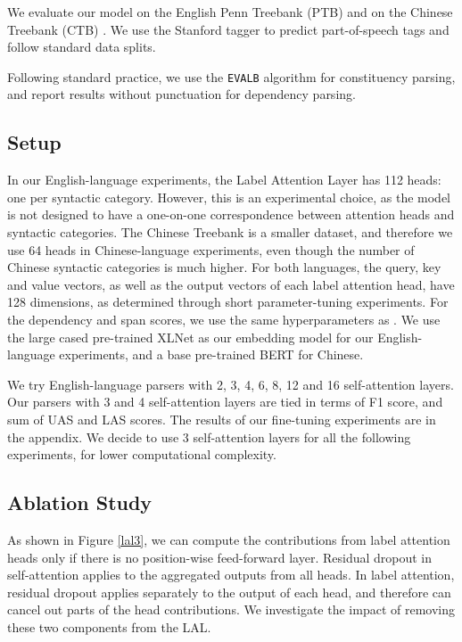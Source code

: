 \documentclass[11pt,a4paper]{article}
\begin{document}
We evaluate our model on the English Penn Treebank (PTB) \cite{marcus1993building} and on the Chinese Treebank (CTB) \cite{xue2005penn}. We use the Stanford tagger \cite{toutanova2003feature} to predict part-of-speech tags and follow standard data splits.

Following standard practice, we use the \texttt{EVALB} algorithm \cite{sekine1997evalb} for constituency parsing, and report results without punctuation for dependency parsing.

\subsection{Setup}
In our English-language experiments, the Label Attention Layer has 112 heads: one per syntactic category. However, this is an experimental choice, as the model is not designed to have a one-on-one correspondence between attention heads and syntactic categories. The Chinese Treebank is a smaller dataset, and therefore we use 64 heads in Chinese-language experiments, even though the number of Chinese syntactic categories is much higher. For both languages, the query, key and value vectors, as well as the output vectors of each label attention head, have 128 dimensions, as determined through short parameter-tuning experiments. For the dependency and span scores, we use the same hyperparameters as \citet{zhou2019head}. We use the large cased pre-trained XLNet \cite{yang2019xlnet} as our embedding model for our English-language experiments, and a base pre-trained BERT \cite{devlin2018bert} for Chinese. 

We try English-language parsers with 2, 3, 4, 6, 8, 12 and 16 self-attention layers. Our parsers with 3 and 4 self-attention layers are tied in terms of F1 score, and sum of UAS and LAS scores. The results of our fine-tuning experiments are in the appendix. We decide to use 3 self-attention layers for all the following experiments, for lower computational complexity.

\subsection{Ablation Study}

As shown in Figure \ref{lal3}, we can compute the contributions from label attention heads only if there is no position-wise feed-forward layer. Residual dropout in self-attention applies to the aggregated outputs from all heads. In label attention, residual dropout applies separately to the output of each head, and therefore can cancel out parts of the head contributions. We investigate the impact of removing these two components from the LAL.
\end{document}
